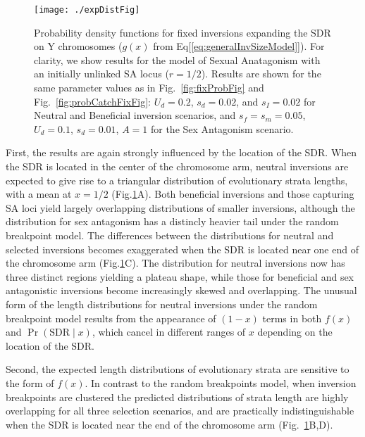 \documentclass{article}
\begin{document}
 \begin{figure}[htbp]
 \centering
 \texttt{[image: ./expDistFig]}
 \caption{Probability density functions for fixed inversions expanding the SDR on Y chromosomes ($g(x)$ from Eq[\ref{eq:generalInvSizeModel}]). For clarity, we show results for the model of Sexual Anatagonism with an initially unlinked SA locus ($r = 1/2$). Results are shown for the same parameter values as in Fig.~\ref{fig:fixProbFig} and Fig.~\ref{fig:probCatchFixFig}: $U_d = 0.2$, $s_d = 0.02$, and $s_I = 0.02$ for Neutral and Beneficial inversion scenarios, and $s_f = s_m = 0.05$, $U_d = 0.1$, $s_d = 0.01$, $A = 1$ for the Sex Antagonism scenario.}
 \label{fig:ExpectedDistFig}
 \end{figure}


First, the results are again strongly influenced by the location of the SDR. When the SDR is located in the center of the chromosome arm, neutral inversions are expected to give rise to a triangular distribution of evolutionary strata lengths, with a mean at $x = 1/2$ (Fig.\ref{fig:ExpectedDistFig}A). Both beneficial inversions and those capturing SA loci yield largely overlapping distributions of smaller inversions, although the distribution for sex antagonism has a distincly heavier tail under the random breakpoint model. The differences between the distributions for neutral and selected inversions becomes exaggerated when the SDR is located near one end of the chromosome arm (Fig.\ref{fig:ExpectedDistFig}C). The distribution for neutral inversions now has three distinct regions yielding a plateau shape, while those for beneficial and sex antagonistic inversions become increasingly skewed and overlapping. The unusual form of the length distributions for neutral inversions under the random breakpoint model results from the appearance of $(1 - x)$ terms in both $f(x)$ and $\Pr(\text{SDR} \mid x)$, which cancel in different ranges of $x$ depending on the location of the SDR.  

Second, the expected length distributions of evolutionary strata are sensitive to the form of $f(x)$. In contrast to the random breakpoints model, when inversion breakpoints are clustered the predicted distributions of strata length are highly overlapping for all three selection scenarios, and are practically indistinguishable when the SDR is located near the end of the chromosome arm (Fig.~\ref{fig:ExpectedDistFig}B,D). \vspace{12pt}

\end{document}
